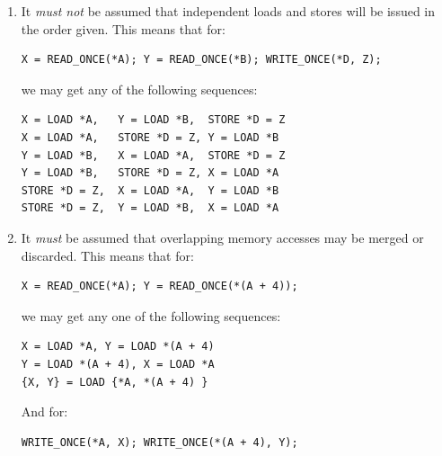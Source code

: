 \begin{enumerate}
\item	It \emph{must not} be assumed that independent loads and stores will
	be issued in the order given.  This means that for:

\begin{minipage}[t]{\columnwidth}
\scriptsize
\begin{verbatim}
X = READ_ONCE(*A); Y = READ_ONCE(*B); WRITE_ONCE(*D, Z);
\end{verbatim}
\end{minipage}

	we may get any of the following sequences:

\begin{minipage}[t]{\columnwidth}
\scriptsize
\begin{verbatim}
X = LOAD *A,   Y = LOAD *B,  STORE *D = Z
X = LOAD *A,   STORE *D = Z, Y = LOAD *B
Y = LOAD *B,   X = LOAD *A,  STORE *D = Z
Y = LOAD *B,   STORE *D = Z, X = LOAD *A
STORE *D = Z,  X = LOAD *A,  Y = LOAD *B
STORE *D = Z,  Y = LOAD *B,  X = LOAD *A
\end{verbatim}
\end{minipage}

\item	It \emph{must} be assumed that overlapping memory accesses may
	be merged or discarded.  This means that for:

\begin{minipage}[t]{\columnwidth}
\scriptsize
\begin{verbatim}
X = READ_ONCE(*A); Y = READ_ONCE(*(A + 4));
\end{verbatim}
\end{minipage}

	we may get any one of the following sequences:

\begin{minipage}[t]{\columnwidth}
\scriptsize
\begin{verbatim}
X = LOAD *A, Y = LOAD *(A + 4)
Y = LOAD *(A + 4), X = LOAD *A
{X, Y} = LOAD {*A, *(A + 4) }
\end{verbatim}
\vspace{1pt}
\end{minipage}

	And for:

\begin{minipage}[t]{\columnwidth}
\scriptsize
\begin{verbatim}
WRITE_ONCE(*A, X); WRITE_ONCE(*(A + 4), Y);
\end{verbatim}
\end{minipage}


\end{enumerate}
